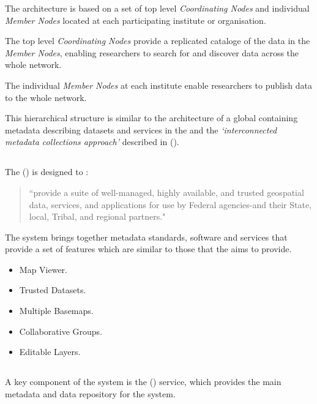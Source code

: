 \documentclass{article}
\begin{document}
The \cite{data-one} architecture is based on a set of top level
\textit{Coordinating Nodes} and individual \textit{Member Nodes} located
at each participating institute or organisation.

The top level \textit{Coordinating Nodes} provide a replicated cataloge of
the data in the \textit{Member Nodes}, enabling researchers to search for
and discover data across the whole network.

The individual \textit{Member Nodes} at each institute enable researchers
to publish data to the whole \cite{data-one} network.

This hierarchical structure is similar to the \cite{vo} architecture of a global
\cite{ivoa-reg} containing metadata describing datasets and services in the
\cite{vo} and the \textit{`interconnected metadata collections approach'}
described in  (\cite{jones-2006}).

\subsection{}

The  (\cite{fgdc})  is designed to :

\begin{quote}
``provide a suite of well-managed, highly available, and trusted geospatial 
data, services, and applications for use by Federal agencies-and their State,
local, Tribal, and regional partners."
\end{quote}

The \cite{fgdc-geo} system brings together metadata standards, software
and services that provide a set of features which are similar to those that
the \cite{trop} aims to provide.

\begin{itemize}
    \item Map Viewer.
    \item Trusted Datasets.
    \item Multiple Basemaps.
    \item Collaborative Groups.
    \item Editable Layers.
\end{itemize}

\subsection{}

A key component of the  system is the 
(\cite{ckan}) service, which provides the main metadata and data repository
for the system.
\end{document}
